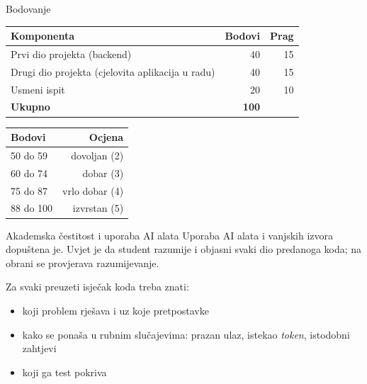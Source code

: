 \begin{frame}{Bodovanje}
\begin{tabular}{@{}lrr@{}}
  \toprule
  \textbf{Komponenta} & \textbf{Bodovi} & \textbf{Prag} \\
  \midrule
  Prvi dio projekta (backend) & 40 & 15 \\
  Drugi dio projekta (cjelovita aplikacija u radu) & 40 & 15 \\
  Usmeni ispit & 20 & 10 \\
  \midrule
  \textbf{Ukupno} & \textbf{100} & \\
  \bottomrule
\end{tabular}

\vspace{0.6em}
\begin{center}
\begin{tabular}{@{}lr@{}}
  \toprule
  \textbf{Bodovi} & \textbf{Ocjena} \\
  \midrule
  50 do 59   & dovoljan (2) \\
  60 do 74   & dobar (3) \\
  75 do 87   & vrlo dobar (4) \\
  88 do 100  & izvrstan (5) \\
  \bottomrule
\end{tabular}
\end{center}
\end{frame}

\begin{frame}{Akademska čestitost i uporaba AI alata}
Uporaba AI alata i vanjskih izvora dopuštena je. Uvjet je da student razumije i objasni svaki dio predanoga koda; na obrani se provjerava razumijevanje.

\vspace{0.4em}
Za svaki preuzeti isječak koda treba znati:
\begin{itemize}
  \item koji problem rješava i uz koje pretpostavke
  \item kako se ponaša u rubnim slučajevima: prazan ulaz, istekao \emph{token}, istodobni zahtjevi
  \item koji ga test pokriva
\end{itemize}

\vspace{0.3em}
\end{frame}


